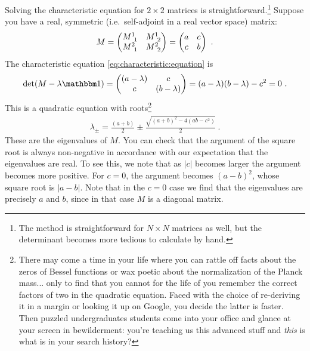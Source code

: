 \documentclass[12pt]{article}
\begin{document}
\begin{example}
Solving the characteristic equation for $2\times 2$ matrices is straightforward.\footnote{The method is straightforward for $N\times N$ matrices as well, but the determinant becomes more tedious to calculate by hand.} Suppose you have a real, symmetric (i.e.\ self-adjoint in a real vector space) matrix:
\begin{align}
    M = 
    \begin{pmatrix}
        M\aij 11 & M\aij 12 \\
        M\aij 21 & M\aij 22
    \end{pmatrix}
    =
    \begin{pmatrix}
        a & c \\
        c & b
    \end{pmatrix} \ .
\end{align}
The characteristic equation \eqref{eq:characteristic:equation} is
\begin{align}
    \det(M - \lambda \one) 
    =
    \begin{pmatrix}
        (a-\lambda) & c \\
        c & (b-\lambda)
    \end{pmatrix}
    = 
    (a-\lambda)(b-\lambda)-c^2 = 0 \ .
\end{align}
This is a quadratic equation with roots\footnote{There may come a time in your life where you can rattle off facts about the zeros of Bessel functions or wax poetic about the normalization of the Planck mass... only to find that you cannot for the life of you remember the correct factors of two in the quadratic equation. Faced with the choice of re-deriving it in a margin or looking it up on Google, you decide the latter is faster. Then puzzled undergraduates students come into your office and glance at your screen in bewilderment: you're teaching us this advanced stuff and \emph{this} is what is in your search history?}
\begin{align}
    \lambda_\pm = \frac{(a+b)}{2}\pm \frac{\sqrt{(a+b)^2 - 4(ab-c^2)}}{2} \ .
\end{align}
These are the eigenvalues of $M$. You can check that the argument of the square root is always non-negative in accordance with our expectation that the eigenvalues are real. To see this, we note that as $|c|$ becomes larger the argument becomes more positive. For $c=0$, the argument becomes $(a-b)^2$, whose square root is $|a-b|$. Note that in the $c=0$ case we find that the eigenvalues are precisely $a$ and $b$, since in that case $M$ is a diagonal matrix.
\end{example}
\end{document}
